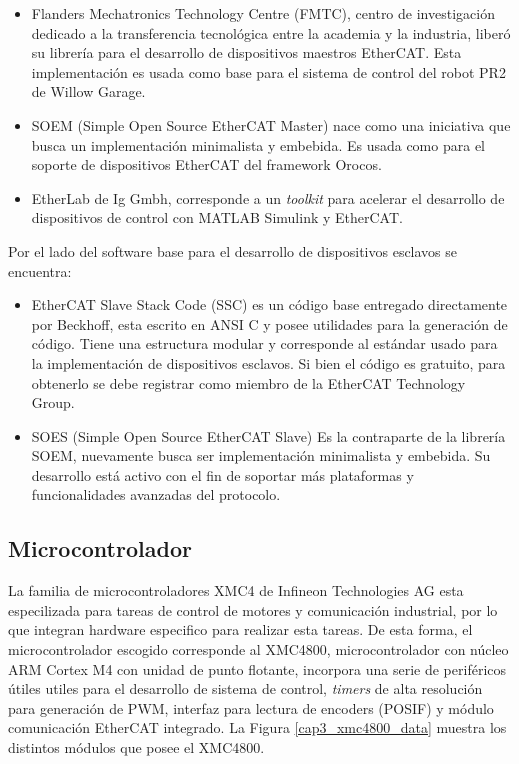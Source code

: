 \begin{itemize}
\item Flanders Mechatronics Technology Centre (FMTC), centro de investigación dedicado a la transferencia tecnológica entre la academia y la industria, liberó su librería para el desarrollo de dispositivos maestros EtherCAT. Esta implementación es usada como base para el sistema de control del robot PR2 de Willow Garage.
\item SOEM (Simple Open Source EtherCAT Master) nace como una iniciativa que busca un implementación minimalista y embebida. Es usada como para el soporte de dispositivos EtherCAT del framework Orocos.
\item EtherLab de Ig Gmbh, corresponde a un \textit{toolkit} para acelerar el desarrollo de dispositivos de control con MATLAB Simulink y EtherCAT.
\end{itemize}

Por el lado del software base para el desarrollo de dispositivos esclavos se encuentra:

\begin{itemize}
\item EtherCAT Slave Stack Code (SSC) es un código base entregado directamente por Beckhoff, esta escrito en ANSI C y posee utilidades para la generación de código. Tiene una estructura modular y corresponde al estándar usado para la implementación de dispositivos esclavos. Si bien el código es gratuito, para obtenerlo se debe registrar como miembro de la  EtherCAT Technology Group.
\item SOES (Simple Open Source EtherCAT Slave) Es la contraparte de la librería SOEM, nuevamente busca ser implementación minimalista y embebida. Su desarrollo está activo con el fin de soportar más plataformas y funcionalidades avanzadas del protocolo.
\end{itemize}


\subsection{Microcontrolador}

La familia de microcontroladores XMC4 de Infineon Technologies AG esta especilizada para tareas de control de motores y comunicación industrial, por lo que integran hardware especifico para realizar esta tareas. De esta forma, el microcontrolador escogido corresponde al XMC4800, microcontrolador con núcleo ARM Cortex M4 con unidad de punto flotante, incorpora una serie de periféricos útiles utiles para el desarrollo de sistema de control, \textit{timers} de alta resolución para generación de PWM, interfaz para lectura de encoders (POSIF) y módulo comunicación EtherCAT integrado. La Figura \ref{cap3_xmc4800_data} muestra los distintos módulos que posee el XMC4800.

